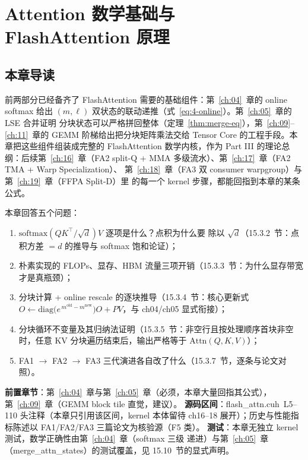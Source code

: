 \providecommand{\url}[1]{\texttt{#1}}
\chapter{Attention 数学基础与 FlashAttention 原理}\label{ch:15}

\section{本章导读}

前两部分已经备齐了 FlashAttention 需要的基础组件：第~\ref{ch:04}~章的 online softmax 给出
$(m,\ell)$ 双状态的联动递推（式~\ref{eq:4-online}）。第~\ref{ch:05}~章的 LSE 合并证明
分块状态可以严格拼回整体（定理~\ref{thm:merge-eq}），第~\ref{ch:09}--\ref{ch:11}~章的
GEMM 阶梯给出把分块矩阵乘法交给 Tensor Core 的工程手段。本章把这些组件组装成完整的
FlashAttention 数学内核，作为 Part III 的理论总纲：后续第~\ref{ch:16}~章（FA2
split-Q + MMA 多级流水）、第~\ref{ch:17}~章（FA2 TMA + Warp Specialization）、
第~\ref{ch:18}~章（FA3 双 consumer warpgroup）与第~\ref{ch:19}~章（FFPA Split-D）里
的每一个 kernel 步骤，都能回指到本章的某条公式。

本章回答五个问题：
\begin{enumerate}[itemsep=0pt,topsep=2pt]
  \item $\mathrm{softmax}\!\left(QK^{\top}/\sqrt{d}\right)V$ 逐项是什么？点积为什么要
        除以 $\sqrt{d}$（15.3.2~节：点积方差 $=d$ 的推导与 softmax 饱和论证）；
  \item 朴素实现的 FLOPs、显存、HBM 流量三项开销（15.3.3~节：为什么显存带宽才是真瓶颈）；
  \item 分块计算 + online rescale 的逐块推导（15.3.4~节：核心更新式
        $O \leftarrow \mathrm{diag}\bigl(e^{\,m^{\mathrm{old}}-m^{\mathrm{new}}}\bigr) O
        + PV$，与 ch04/ch05 显式衔接）；
  \item 分块循环不变量及其归纳法证明（15.3.5~节：非空行且按处理顺序首块非空时，任意 KV 分块遍历结束后，输出严格等于
        $\mathrm{Attn}(Q,K,V)$）；
  \item FA1 $\to$ FA2 $\to$ FA3 三代演进各自改了什么（15.3.7~节，逐条与论文对照）。
\end{enumerate}

\textbf{前置章节}：第~\ref{ch:04}~章与第~\ref{ch:05}~章（必须，本章大量回指其公式），
第~\ref{ch:09}~章（GEMM block tile 直觉，建议）。
\textbf{源码区间}：flash\_attn.cuh~L5--110 头注释（本章只引用该区间，kernel 本体留待
ch16--18 展开）；历史与性能指标陈述以 FA1/FA2/FA3 三篇论文为核验源（F5 类）。
\textbf{测试}：本章无独立 kernel 测试，数学正确性由第~\ref{ch:04}~章（softmax 三级
递进）与第~\ref{ch:05}~章（merge\_attn\_states）的测试覆盖，见 15.10~节的显式声明。

